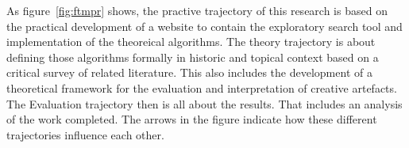 As figure~\ref{fig:ftmpr} shows, the practive trajectory of this research is based on the practical development of a website to contain the exploratory search tool and implementation of the theoreical algorithms. The theory trajectory is about defining those algorithms formally in historic and topical context based on a critical survey of related literature. This also includes the development of a theoretical framework for the evaluation and interpretation of creative artefacts. The Evaluation trajectory then is all about the results. That includes an analysis of the work completed. The arrows in the figure indicate how these different trajectories influence each other.


\stopcontents[chapters]
